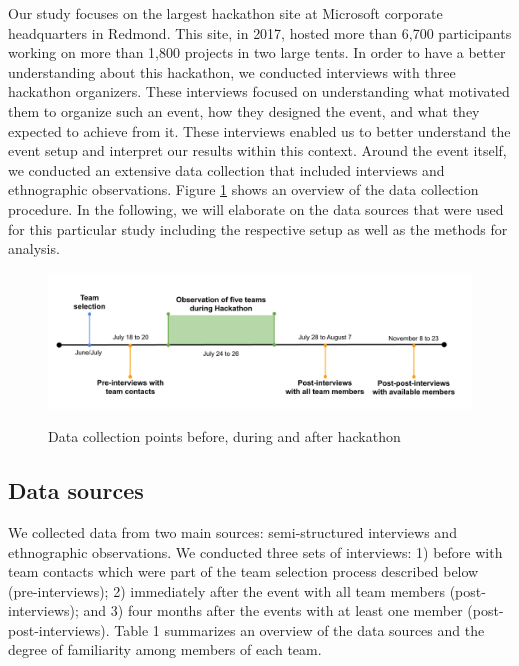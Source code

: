 \documentclass{hcij}
\begin{document}
Our study focuses on the largest hackathon site at Microsoft corporate headquarters in Redmond. This site, in 2017, hosted more than 6,700 participants working on more than 1,800 projects in two large tents. In order to have a better understanding about this hackathon, we conducted interviews with three hackathon organizers. These interviews focused on understanding what motivated them to organize such an event, how they designed the event, and what they expected to achieve from it. These interviews enabled us to better understand the event setup and interpret our results within this context. Around the event itself, we conducted an extensive data collection that included interviews and ethnographic observations. Figure \ref{fig:timeline} shows an overview of the data collection procedure. In the following, we will elaborate on the data sources that were used for this particular study including the respective setup as well as the methods for analysis.

\begin{figure}[H]
\caption{Data collection points before, during and after hackathon}
\includegraphics[width=6in]{hackathon-timeline.png}
\label{fig:timeline}
\end{figure}


\subsection{Data sources}
We collected data from two main sources: semi-structured interviews and ethnographic observations. We conducted three sets of interviews: 1) before with team contacts which were part of the team selection process described below (pre-interviews); 2) immediately after the event with all team members (post-interviews); and 3) four months after the events with at least one member (post-post-interviews). Table 1 summarizes an overview of the data sources and the degree of familiarity among members of each team.
\end{document}
